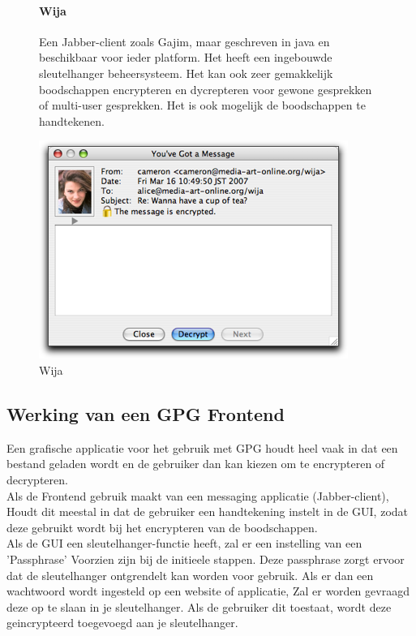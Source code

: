 \documentclass[12pt]{article}
\begin{document}
				\begin{figure}[!ht]				
					\paragraph{Wija}
						Een Jabber-client zoals Gajim, maar geschreven in java en beschikbaar voor 								ieder platform.
						Het heeft een ingebouwde sleutelhanger beheersysteem. Het kan ook zeer 									gemakkelijk boodschappen encrypteren en dycrepteren voor gewone gesprekken of 							multi-user gesprekken.
						Het is ook mogelijk de boodschappen te handtekenen.
					\begin{center}
						\includegraphics[scale=0.7]{Pictures/wija}
					\end{center}
					\caption{Wija}
				\end{figure}
				
		\subsection{Werking van een GPG Frontend}\label{Frontend}
			Een grafische applicatie voor het gebruik met GPG houdt heel vaak in dat een bestand
			geladen wordt en de gebruiker dan kan kiezen om te encrypteren of decrypteren.\\
			Als de Frontend gebruik maakt van een messaging applicatie (Jabber-client),
			Houdt dit meestal in dat de gebruiker een handtekening instelt in de GUI,
			zodat deze gebruikt wordt bij het encrypteren van de boodschappen.\\
			Als de GUI een sleutelhanger-functie heeft, zal er een instelling van een 'Passphrase'
			Voorzien zijn bij de initieele stappen. Deze passphrase zorgt ervoor dat de sleutelhanger
			ontgrendelt kan worden voor gebruik. Als er dan een wachtwoord wordt ingesteld op een
			website of applicatie, Zal er worden gevraagd deze op te slaan in je sleutelhanger.
			Als de gebruiker dit toestaat, wordt deze geincrypteerd toegevoegd aan je sleutelhanger.

		\newpage
		
		\newpage
		\printindex \label{Index}			
\end{document}
